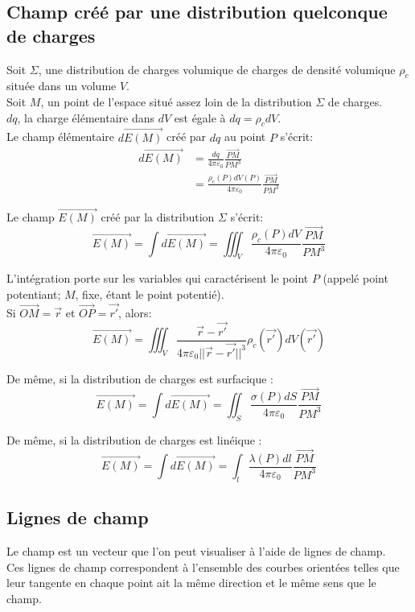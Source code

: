 \documentclass[../main.tex]{subfile}
\begin{document}
\subsection{Champ créé par une distribution quelconque de charges}
Soit $\Sigma$, une distribution de charges volumique de charges de densité volumique $\rho_c$ située dans un volume $V$.\\
Soit $M$, un point de l'espace situé assez loin de la distribution $\Sigma$ de charges.\\
$dq$, la charge élémentaire dans $dV$ est égale à $dq = \rho_cdV$.\\
Le champ élémentaire $d\vec{E(M)}$ créé par $dq$ au point $P$ s'écrit:
$$
\begin{aligned}
	d\vec{E(M)} &= \frac{dq}{4\pi\varepsilon_0} \frac{\vec{PM}}{PM^3}\\
	&= \frac{\rho_c(P) dV(P)}{4\pi\varepsilon_0}\frac{\vec{PM}}{PM^3}
\end{aligned}
$$

Le champ $\vec{E(M)}$ créé par la distribution $\Sigma$ s'écrit:
$$\vec{E(M)} = \int d\vec{E(M)} = \iiint_V \frac{\rho_c(P)dV}{4\pi\varepsilon_0} \frac{\vec{PM}}{PM^3}$$

L'intégration porte sur les variables qui caractérisent le point $P$ (appelé point potentiant; $M$, fixe, étant le point potentié).\\
Si $\vec{OM} = \vec{r}$ et $\vec{OP} = \vec{r'}$, alors:
$$\vec{E(M)} = \iiint_V \frac{\vec{r} - \vec{r'}}{4\pi\varepsilon_0 ||\vec{r} - \vec{r'}||^3} \rho_c(\vec{r'}) dV(\vec{r'})$$

De même, si la distribution de charges est surfacique : 
$$\vec{E(M)} = \int d\vec{E(M)} = \iint_S \frac{\sigma(P) dS}{4\pi\varepsilon_0} \frac{\vec{PM}}{PM^3}$$

De même, si la distribution de charges est linéique : 
$$\vec{E(M)} = \int d\vec{E(M)} = \int_l \frac{\lambda(P) dl}{4\pi\varepsilon_0} \frac{\vec{PM}}{PM^3}$$

\subsection{Lignes de champ}
Le champ est un vecteur que l'on peut visualiser à l'aide de lignes de champ.\\
Ces lignes de champ correspondent à l'ensemble des courbes orientées telles que leur tangente en chaque point ait la même direction et le même sens que le champ.


\end{document}
